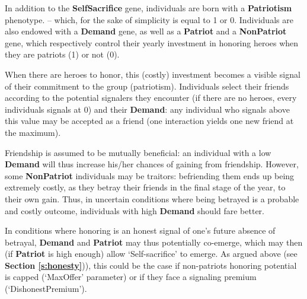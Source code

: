 \documentclass[a4paper,12pt]{report}
\begin{document}
In addition to the \textbf{SelfSacrifice} gene, individuals are born with a 
\textbf{Patriotism} phenotype.
– which, for the sake of simplicity is equal to 1 or 0.
Individuals are also endowed with a \textbf{Demand} gene, as well as a \textbf{Patriot}
 and a \textbf{NonPatriot} gene, which respectively control their yearly
 investment in honoring heroes when they are patriots (1) or not (0).

When there are heroes to honor, this (costly) investment becomes a
visible signal of their commitment to the group (patriotism).
Individuals select their friends according to the potential
signalers they encounter (if there are no heroes, every individuals
signals at 0) and their \textbf{Demand}: any individual who signals above this
value may be accepted as a friend (one interaction yields one new friend at the maximum).

Friendship is assumed to be mutually beneficial:
an individual with a low \textbf{Demand}
will thus increase his/her chances of gaining from friendship.
However, some \textbf{NonPatriot} individuals may be traitors:
befriending them ends up being extremely costly, as they betray their friends
in the final stage of the year, to their own gain.
Thus, in uncertain conditions where being betrayed is a probable and costly outcome,
individuals with high \textbf{Demand} should fare better.

In conditions where honoring is an honest signal of one’s
future absence of betrayal, \textbf{Demand} and \textbf{Patriot}
may thus potentially co-emerge, which may then (if \textbf{Patriot} is high enough)
allow ‘Self-sacrifice’ to emerge. As argued above (see \textbf{Section \ref{s:honesty}})),
this could be the case if non-patriots honoring potential is capped
(‘MaxOffer’ parameter) or if they face a signaling premium (‘DishonestPremium’).

\end{document}
